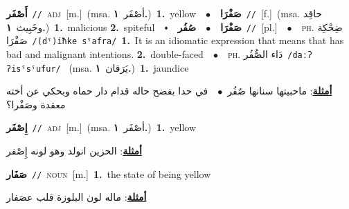 \documentclass[10pt,a4paper,twoside]{article} %
\begin{document}
\begin{multicols}{2}
{\setlength\topsep{0pt}\textbf{\foreignlanguage{arabic}{أَصْفَر}}\ {\color{gray}\texttt{//}\color{black}}\ \textsc{adj}\ [m.]\ \color{gray}(msa. \foreignlanguage{arabic}{أصْفَر}~\foreignlanguage{arabic}{\textbf{١.}})\color{black}\ \textbf{1.}~yellow\ \ $\bullet$\ \ \setlength\topsep{0pt}\textbf{\foreignlanguage{arabic}{صَفْرَا}}\ {\color{gray}\texttt{//}\color{black}}\ [f.]\ \color{gray}(msa. \foreignlanguage{arabic}{حاقِد وخَبِيث}~\foreignlanguage{arabic}{\textbf{١.}})\color{black}\ \textbf{1.}~malicious  \textbf{2.}~spiteful\ \ $\smblkdiamond$\ \ \setlength\topsep{0pt}\textbf{\foreignlanguage{arabic}{صَفْرَا}}\ \ $\bullet$\ \ \setlength\topsep{0pt}\textbf{\foreignlanguage{arabic}{صُفُر}}\ {\color{gray}\texttt{//}\color{black}}\ [pl.]\ \ $\bullet$\ \ \textsc{ph.} \color{gray} \foreignlanguage{arabic}{ضِحْكِة صَفْرَا}\color{black}\ {\color{gray}\texttt{/{\sffamily (dˤ)iħke sˤafra}/}\color{black}}\ \textbf{1.}~It is an idiomatic expression that means that has bad and malignant intentions.  \textbf{2.}~double-faced\ \ $\bullet$\ \ \textsc{ph.} \color{gray} \foreignlanguage{arabic}{دَاء الصُّفُر}\color{black}\ {\color{gray}\texttt{/{\sffamily daːʔ ʔisˤsˤufur}/}\color{black}}\ \color{gray} (msa. \foreignlanguage{arabic}{يَرَقان}~\foreignlanguage{arabic}{\textbf{١.}})\color{black}\ \textbf{1.}~jaundice\  \begin{flushright}\color{gray}\foreignlanguage{arabic}{\textbf{\underline{\foreignlanguage{arabic}{أمثلة}}}: ماحبيتها سنانها صُفُر\ $\bullet$\ \  في حدا بفضح حاله قدام دار حماه وبحكي عن أخته معقدة وصَفْرا؟}\end{flushright}\color{black}} \vspace{2mm}

{\setlength\topsep{0pt}\textbf{\foreignlanguage{arabic}{إِصْفَر}}\ {\color{gray}\texttt{//}\color{black}}\ \textsc{adj}\ [m.]\ \color{gray}(msa. \foreignlanguage{arabic}{أصْفَر}~\foreignlanguage{arabic}{\textbf{١.}})\color{black}\ \textbf{1.}~yellow\  \begin{flushright}\color{gray}\foreignlanguage{arabic}{\textbf{\underline{\foreignlanguage{arabic}{أمثلة}}}: الحزين انولد وهو لونه إِصْفر}\end{flushright}\color{black}} \vspace{2mm}

{\setlength\topsep{0pt}\textbf{\foreignlanguage{arabic}{صَفَار}}\ {\color{gray}\texttt{//}\color{black}}\ \textsc{noun}\ [m.]\ \textbf{1.}~the state of being yellow\  \begin{flushright}\color{gray}\foreignlanguage{arabic}{\textbf{\underline{\foreignlanguage{arabic}{أمثلة}}}: ماله لون البلوزة قلب عصَفار}\end{flushright}\color{black}} \vspace{2mm}


\end{multicols}
\end{document}
